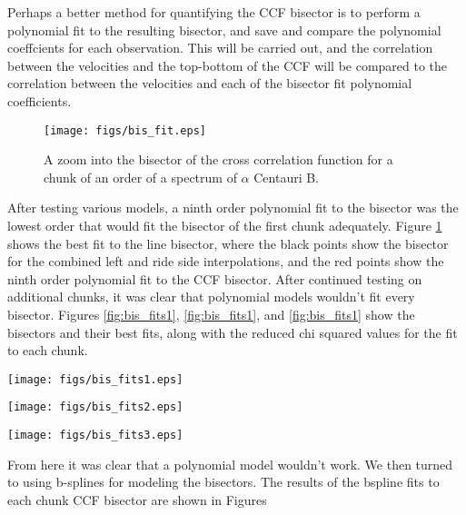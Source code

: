\documentclass[iop]{emulateapj}
\def\acenb{$\alpha$ Centauri B}
\begin{document}
Perhaps a better method for quantifying the CCF bisector is to perform a polynomial fit to the resulting bisector, and save and compare the polynomial coeffcients for each observation. This will be carried out, and the correlation between the velocities and the top-bottom of the CCF will be compared to the correlation between the velocities and each of the bisector fit polynomial coefficients.

\begin{figure}[ht]
\texttt{[image: figs/bis\_fit.eps]}
\caption{\label{fig:bis_fit} A zoom into the bisector of the cross correlation function for a chunk of an order of a spectrum of \acenb.}
\end{figure}

After testing various models, a ninth order polynomial fit to the bisector was the lowest order that would fit the bisector of the first chunk adequately. Figure \ref{fig:bis_fit} shows the best fit to the line bisector, where the black points show the bisector for the combined left and ride side interpolations, and the red points show the ninth order polynomial fit to the CCF bisector. After continued testing on additional chunks, it was clear that polynomial models wouldn't fit every bisector. Figures \ref{fig:bis_fits1}, \ref{fig:bis_fits1}, and \ref{fig:bis_fits1} show the bisectors and their best fits, along with the reduced chi squared values for the fit to each chunk.

\begin{figure*}[ht]
\texttt{[image: figs/bis\_fits1.eps]}
\caption{\label{fig:bis_fits1} The bisectors and their respective fits for the first twelve chunks of a spectrum of \acenb.}
\end{figure*}

\begin{figure*}[ht]
\texttt{[image: figs/bis\_fits2.eps]}
\caption{\label{fig:bis_fits2} The same as figure \ref{fig:bis_fits1}, but for the next twelve chunks.}
\end{figure*}

\begin{figure*}[ht]
\texttt{[image: figs/bis\_fits3.eps]}
\caption{\label{fig:bis_fits3} The same as figure \ref{fig:bis_fits1}, but for the last twelve chunks.}
\end{figure*}

From here it was clear that a polynomial model wouldn't work. We then turned to using b-splines for modeling the bisectors. The results of the bspline fits to each chunk CCF bisector are shown in Figures 
\end{document}
